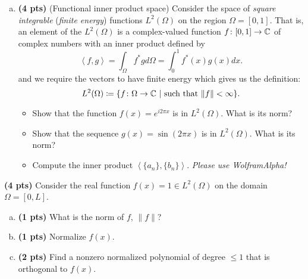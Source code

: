 \documentclass[12pt]{article} %
\newcommand{\innprod}[2]{\left\langle #1, #2\right\rangle}
\begin{document}
\begin{problem}
\begin{enumerate}[(a)]
\item \textbf{(4 pts)} (Functional inner product space) Consider the space of \emph{square integrable} (\emph{finite energy}) functions $L^2(\Omega)$ on the region $\Omega=[0,1]$. That is, an element of the $L^2(\Omega)$ is a complex-valued function $f \colon [0,1] \to \mathbb{C}$ of complex numbers with an inner product defined by
\[
\innprod{f}{g} = \int_\Omega f^*g d\Omega = \int_0^1 f^*(x) g(x)dx.
\]
and we require the vectors to have finite energy which gives us the definition:
\[
L^2(\Omega) \coloneqq \{ f\colon \Omega \to \mathbb{C} ~|~ \textrm{such that $\|f\|<\infty$}\}.
\]
\begin{itemize}
\item Show that the function $f(x)= e^{i2\pi x}$ is in $L^2(\Omega)$. What is its norm? 
\item Show that the sequence $g(x) = \sin(2\pi x)$ is in $L^2(\Omega)$. What is its norm?
\item Compute the inner product $\innprod{\{a_n\}}{\{b_n\}}$. \emph{Please use WolframAlpha!}
\end{itemize}
\end{enumerate}
\end{problem}

\vspace*{1cm}
\begin{problem} \textbf{(4 pts)} Consider the real function $f(x)=1 \in L^2(\Omega)$ on the domain $\Omega = [0,L]$.
	\begin{enumerate}[(a)]
		\item \textbf{(1 pts)} What is the norm of $f$, $\|f\|$?
		\item \textbf{(1 pts)} Normalize $f(x)$.
		\item \textbf{(2 pts)} Find a nonzero normalized polynomial of degree $\leq 1$ that is orthogonal to $f(x)$.
	\end{enumerate}
\end{problem}
\end{document}
